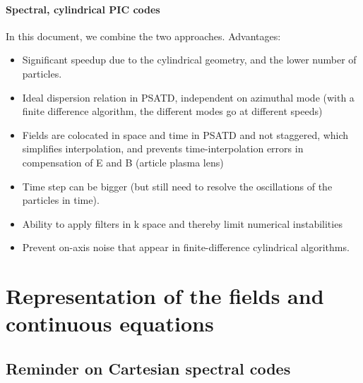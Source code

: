 \documentclass[a4paper]{article}   	%
\begin{document}
\paragraph{Spectral, cylindrical PIC codes } In this document, we combine the two approaches. Advantages:
\begin{itemize}
\item Significant speedup due to the cylindrical geometry, and the
  lower number of particles.
\item Ideal dispersion relation in PSATD, independent on azimuthal mode (with a finite difference algorithm, the different modes go at different speeds)
\item Fields are colocated in space and time in PSATD and not
  staggered, which simplifies interpolation, and prevents
  time-interpolation errors in compensation of E and B (article plasma
  lens)
\item Time step can be bigger (but still need to resolve the
  oscillations of the particles in time).
\item Ability to apply filters in k space and thereby limit numerical instabilities
\item Prevent on-axis noise that appear in finite-difference cylindrical algorithms.
\end{itemize}


\section{Representation of the fields and continuous equations}

\subsection{Reminder on Cartesian spectral codes}
\end{document}
